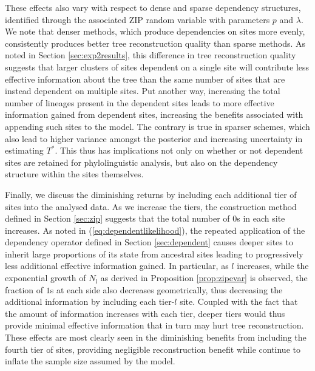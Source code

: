These effects also vary with respect to dense and sparse dependency structures, identified through the associated ZIP random variable with parameters $p$ and $\lambda$. We note that denser methods, which produce dependencies on sites more evenly, consistently produces better tree reconstruction quality than sparse methods. As noted in Section \ref{sec:exp2results}, this difference in tree reconstruction quality suggests that larger clusters of sites dependent on a single site will contribute less effective information about the tree than the same number of sites that are instead dependent on multiple sites. Put another way, increasing the total number of lineages present in the dependent sites leads to more effective information gained from dependent sites, increasing the benefits associated with appending such sites to the model. The contrary is true in sparser schemes, which also lead to higher variance amongst the posterior and increasing uncertainty in estimating $T^*$. This thus has implications not only on whether or not dependent sites are retained for phylolinguistic analysis, but also on the dependency structure within the sites themselves. 

Finally, we discuss the diminishing returns by including each additional tier of sites into the analysed data. As we increase the tiers, the construction method defined in Section \ref{sec:zip} suggests that the total number of $0$s in each site increases. As noted in (\ref{eq:dependentlikelihood}), the repeated application of the dependency operator defined in Section \ref{sec:dependent} causes deeper sites to inherit large proportions of its state from ancestral sites leading to progressively less additional effective information gained. In particular, as $l$ increases, while the exponential growth of $N_l$ as derived in Proposition \ref{prop:zipevar} is observed, the fraction of $1$s at each side also decreases geometrically, thus decreasing the additional information by including each tier-$l$ site. Coupled with the fact that the amount of information increases with each tier, deeper tiers would thus provide minimal effective information that in turn may hurt tree reconstruction. These effects are most clearly seen in the diminishing benefits from including the fourth tier of sites, providing negligible reconstruction benefit while continue to inflate the sample size assumed by the model.

